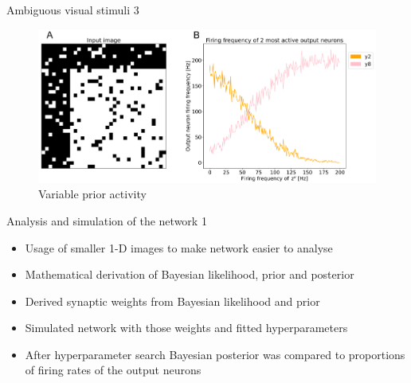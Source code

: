 \documentclass[aspectratio=169]{beamer}
\begin{document}

\begin{frame}{Ambiguous visual stimuli 3}
		\begin{figure}
        \includegraphics[width=0.7\linewidth]{../Latex/figures/horvertAdaptiveInh/YFrequency_prior.png}
      \\   \scriptsize Variable prior activity
      \end{figure} 
\end{frame}

\begin{frame}{Analysis and
 simulation of the network 1}
	\begin{itemize}
	  \item Usage of smaller 1-D images to make network easier to analyse 
	  \item Mathematical derivation of Bayesian likelihood, prior and posterior
	  \item Derived synaptic weights from Bayesian likelihood and prior
	  \item Simulated network with those weights and fitted hyperparameters
	  \item After hyperparameter search Bayesian posterior was compared to proportions of firing rates of the output neurons
	\end{itemize}
\end{frame}
\end{document}
